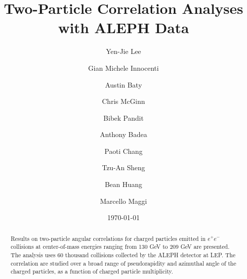 \documentclass[aps,prl,twocolumn,showpacs,superscriptaddress,groupedaddress]{revtex4}  %
\begin{document}
\widetext
{}

\title{Two-Particle Correlation Analyses with ALEPH Data}
\author{Yen-Jie Lee}
\author{Gian Michele Innocenti}
\author{Austin Baty}
\author{Chris McGinn}
\author{Bibek Pandit}
\author{Anthony Badea}
%
\author{Paoti Chang}
\author{Tzu-An Sheng}
\author{Bean Huang}
%
\author{Marcello Maggi}
%
\date{\today}


\begin{abstract}
Results on two-particle angular correlations for charged particles emitted in $e^+e^-$ collisions at center-of-mass energies ranging from 130 GeV to 209 GeV are presented. The analysis uses 60 thousand collisions collected by the ALEPH detector at LEP. The correlation are studied over a broad range of pseudorapidity and azimuthal angle of the charged particles, as a function of charged particle multiplicity.

\end{abstract}
\end{document}
